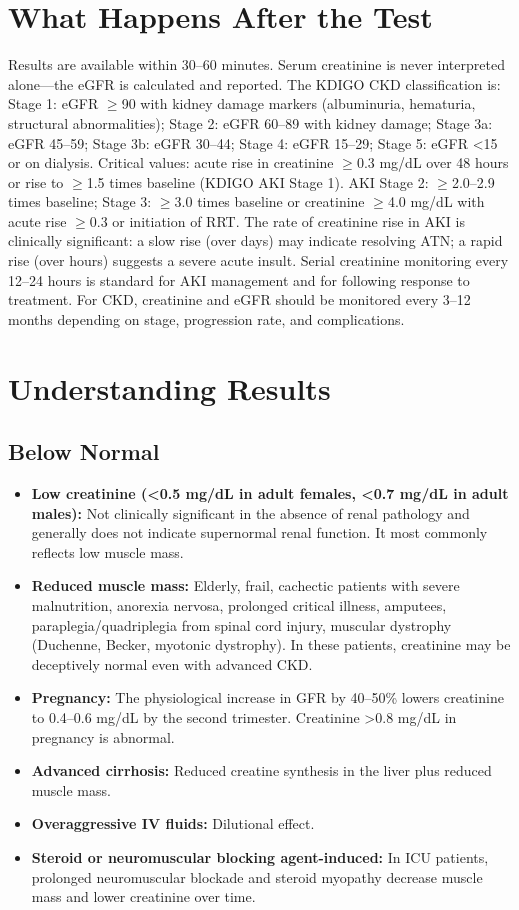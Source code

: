 \section*{What Happens After the Test}
Results are available within 30--60 minutes. Serum creatinine is never interpreted alone---the eGFR is calculated and reported. The KDIGO CKD classification is: Stage 1: eGFR $\geq$90 with kidney damage markers (albuminuria, hematuria, structural abnormalities); Stage 2: eGFR 60--89 with kidney damage; Stage 3a: eGFR 45--59; Stage 3b: eGFR 30--44; Stage 4: eGFR 15--29; Stage 5: eGFR <15 or on dialysis. Critical values: acute rise in creatinine $\geq$0.3 mg/dL over 48 hours or rise to $\geq$1.5 times baseline (KDIGO AKI Stage 1). AKI Stage 2: $\geq$2.0--2.9 times baseline; Stage 3: $\geq$3.0 times baseline or creatinine $\geq$4.0 mg/dL with acute rise $\geq$0.3 or initiation of RRT. The rate of creatinine rise in AKI is clinically significant: a slow rise (over days) may indicate resolving ATN; a rapid rise (over hours) suggests a severe acute insult. Serial creatinine monitoring every 12--24 hours is standard for AKI management and for following response to treatment. For CKD, creatinine and eGFR should be monitored every 3--12 months depending on stage, progression rate, and complications.

\section*{Understanding Results}

\subsection*{Below Normal}
\begin{itemize}
  \item \textbf{Low creatinine (<0.5 mg/dL in adult females, <0.7 mg/dL in adult males):} Not clinically significant in the absence of renal pathology and generally does not indicate supernormal renal function. It most commonly reflects low muscle mass.
  \item \textbf{Reduced muscle mass:} Elderly, frail, cachectic patients with severe malnutrition, anorexia nervosa, prolonged critical illness, amputees, paraplegia/quadriplegia from spinal cord injury, muscular dystrophy (Duchenne, Becker, myotonic dystrophy). In these patients, creatinine may be deceptively normal even with advanced CKD.
  \item \textbf{Pregnancy:} The physiological increase in GFR by 40--50\% lowers creatinine to 0.4--0.6 mg/dL by the second trimester. Creatinine >0.8 mg/dL in pregnancy is abnormal.
  \item \textbf{Advanced cirrhosis:} Reduced creatine synthesis in the liver plus reduced muscle mass.
  \item \textbf{Overaggressive IV fluids:} Dilutional effect.
  \item \textbf{Steroid or neuromuscular blocking agent-induced:} In ICU patients, prolonged neuromuscular blockade and steroid myopathy decrease muscle mass and lower creatinine over time.
\end{itemize}

